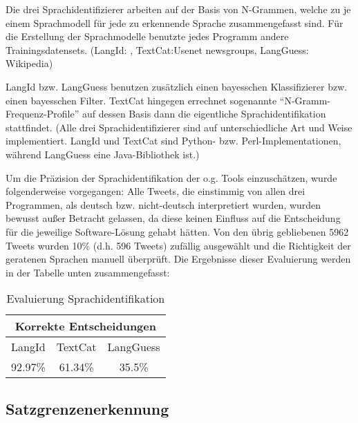 \documentclass[11pt]{article}
\begin{document}
Die drei Sprachidentifizierer arbeiten auf der Basis von N-Grammen, welche zu je
einem Sprachmodell für jede zu erkennende Sprache zusammengefasst sind. Für die
Erstellung der Sprachmodelle benutzte jedes Programm andere Trainingsdatensets.
(LangId:
, TextCat:Usenet newsgroups, LangGuess: Wikipedia)

LangId bzw. LangGuess benutzen zusätzlich einen bayesschen Klassifizierer bzw.
einen bayesschen Filter. TextCat hingegen errechnet sogenannte
``N-Gramm-Frequenz-Profile'' auf dessen Basis dann die eigentliche
Sprachidentifikation stattfindet. \newline 
(Alle drei Sprachidentifizierer sind auf unterschiedliche Art und Weise
implementiert. LangId und TextCat sind Python- bzw. Perl-Implementationen, 
während LangGuess eine Java-Bibliothek ist.)




\newline 
Um die Präzision der Sprachidentifikation der o.g. Tools einzuschätzen, wurde folgenderweise vorgegangen: Alle
Tweets, die einstimmig von allen drei Programmen, als deutsch bzw. nicht-deutsch
interpretiert wurden, wurden bewusst außer Betracht gelassen, da diese keinen Einfluss auf 
die Entscheidung für die jeweilige Software-Lösung gehabt hätten. Von den übrig
gebliebenen 5962 Tweets wurden 10\%{} (d.h. 596 Tweets) zufällig ausgewählt und die Richtigkeit der
geratenen Sprachen manuell überprüft. Die Ergebnisse dieser
Evaluierung werden in der Tabelle unten zusammengefasst: \newline


\begin{table}[h]
\begin{center}
\begin{tabular}{|c|c|c|}
\hline
\multicolumn{3}{|c|}{Korrekte Entscheidungen}\\\hline\hline
LangId & TextCat & LangGuess \\\hline
92.97\% & 61.34\% & 35.5\% \\\hline
\end{tabular}
\caption{Evaluierung Sprachidentifikation}
\end{center}
\end{table}





\subsection{Satzgrenzenerkennung}
\end{document}

